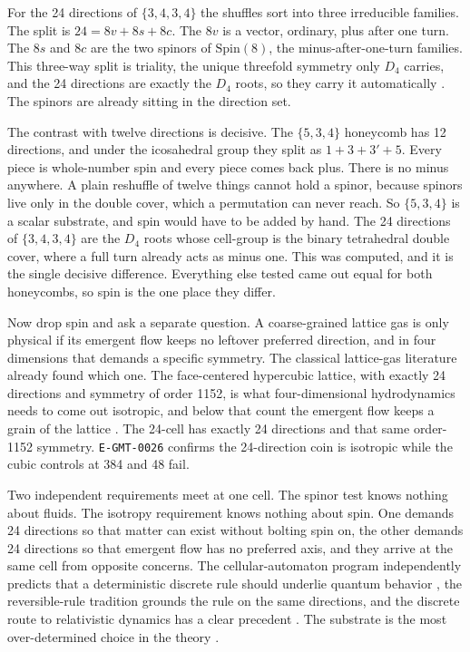 For the 24 directions of $\{3,4,3,4\}$ the shuffles sort into three irreducible
families. The split is $24 = 8v + 8s + 8c$. The $8v$ is a vector, ordinary, plus
after one turn. The $8s$ and $8c$ are the two spinors of $\mathrm{Spin}(8)$, the
minus-after-one-turn families. This three-way split is triality, the unique
threefold symmetry only $D_4$ carries, and the 24 directions are exactly the
$D_4$ roots, so they carry it automatically \cite{baez2002octonions}. The
spinors are already sitting in the direction set.

The contrast with twelve directions is decisive. The $\{5,3,4\}$ honeycomb has 12
directions, and under the icosahedral group they split as $1 + 3 + 3' + 5$. Every
piece is whole-number spin and every piece comes back plus. There is no minus
anywhere. A plain reshuffle of twelve things cannot hold a spinor, because
spinors live only in the double cover, which a permutation can never reach. So
$\{5,3,4\}$ is a scalar substrate, and spin would have to be added by
hand. The 24 directions of $\{3,4,3,4\}$ are the $D_4$ roots whose cell-group is
the binary tetrahedral double cover, where a full turn already acts as minus one.
This was computed, and it is the single decisive difference.
Everything else tested came out equal for both honeycombs, so spin is the one
place they differ.

Now drop spin and ask a separate question. A coarse-grained lattice gas is only
physical if its emergent flow keeps no leftover preferred direction, and in four
dimensions that demands a specific symmetry. The classical lattice-gas literature
already found which one. The face-centered hypercubic lattice, with exactly 24
directions and symmetry of order 1152, is what four-dimensional hydrodynamics
needs to come out isotropic, and below that count the emergent flow keeps a grain
of the lattice \cite{frisch1986, dhumieres1986}. The 24-cell has exactly 24
directions and that same order-1152 symmetry. \texttt{E-GMT-0026} confirms the
24-direction coin is isotropic while the cubic controls at 384 and 48 fail.

Two independent requirements meet at one cell. The spinor test knows nothing about fluids. The
isotropy requirement knows nothing about spin. One demands 24 directions so that
matter can exist without bolting spin on, the other demands 24 directions so that
emergent flow has no preferred axis, and they arrive at the same cell from
opposite concerns. The cellular-automaton program independently predicts that a
deterministic discrete rule should underlie quantum behavior \cite{thooft2016},
the reversible-rule tradition grounds the rule on the same directions, and the
discrete route to relativistic dynamics has a clear precedent \cite{dariano2014}.
The substrate is the most over-determined choice in the theory
\cite{cluesurf2026repo}.
